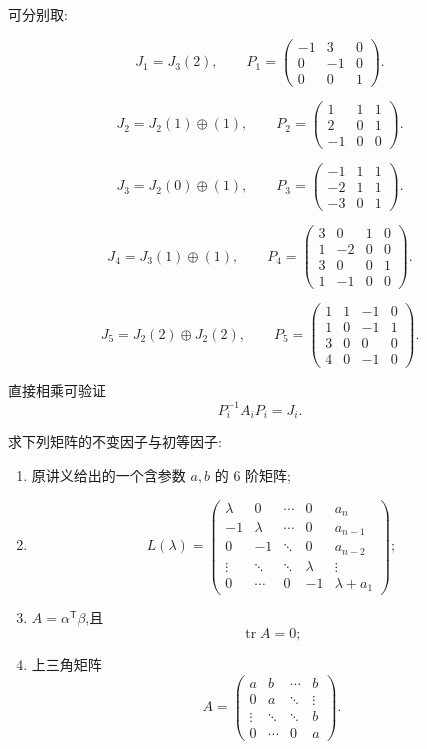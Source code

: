 \begin{solution}
可分别取:

\[
J_1=J_3(2),\qquad
P_1=
\begin{pmatrix}
-1&3&0\\
0&-1&0\\
0&0&1
\end{pmatrix}.
\]

\[
J_2=J_2(1)\oplus(1),\qquad
P_2=
\begin{pmatrix}
1&1&1\\
2&0&1\\
-1&0&0
\end{pmatrix}.
\]

\[
J_3=J_2(0)\oplus(1),\qquad
P_3=
\begin{pmatrix}
-1&1&1\\
-2&1&1\\
-3&0&1
\end{pmatrix}.
\]

\[
J_4=J_3(1)\oplus(1),\qquad
P_4=
\begin{pmatrix}
3&0&1&0\\
1&-2&0&0\\
3&0&0&1\\
1&-1&0&0
\end{pmatrix}.
\]

\[
J_5=J_2(2)\oplus J_2(2),\qquad
P_5=
\begin{pmatrix}
1&1&-1&0\\
1&0&-1&1\\
3&0&0&0\\
4&0&-1&0
\end{pmatrix}.
\]

直接相乘可验证
\[
\boxed{P_i^{-1}A_iP_i=J_i}.
\]
\end{solution}


\begin{example}
求下列矩阵的不变因子与初等因子:
\begin{enumerate}
    \item 原讲义给出的一个含参数 $a,b$ 的 $6$ 阶矩阵;
    \item
    \[
    L(\lambda)=
    \begin{pmatrix}
    \lambda&0&\cdots&0&a_n\\
    -1&\lambda&\cdots&0&a_{n-1}\\
    0&-1&\ddots&0&a_{n-2}\\
    \vdots&\ddots&\ddots&\lambda&\vdots\\
    0&\cdots&0&-1&\lambda+a_1
    \end{pmatrix};
    \]
    \item $A=\alpha^{\mathsf T}\beta$,且
    \[
    \operatorname{tr}A=0;
    \]
    \item 上三角矩阵
    \[
    A=
    \begin{pmatrix}
    a&b&\cdots&b\\
    0&a&\ddots&\vdots\\
    \vdots&\ddots&\ddots&b\\
    0&\cdots&0&a
    \end{pmatrix}.
    \]
\end{enumerate}
\end{example}
\exampleblank

